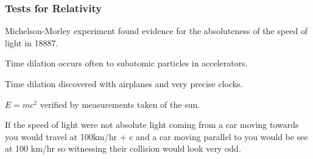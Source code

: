 \documentclass[12pt]{article}
\begin{document}
\subsubsection{Tests for Relativity}
Michelson-Morley experiment found evidence for the absoluteness of the speed of light in 18887.

Time dilation occurs often to subatomic particles in accelerators.

Time dilation discovered with airplanes and very precise clocks.

$E = mc^2$ verified by measurements taken of the sun.

If the speed of light were not absolute light coming from a car moving towards you would travel at 100km/hr + c and a car moving parallel to you would be see at 100 km/hr so witnessing their collision would look very odd.
\end{document}
